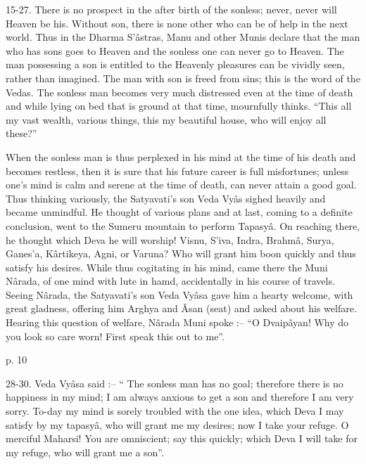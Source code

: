  

15-27. There is no prospect in the after birth of the sonless; never, never will Heaven be his. Without son, there is none other who can be of help in the next world. Thus in the Dharma S’âstras, Manu and other Munis declare that the man who has sons goes to Heaven and the sonless one can never go to Heaven. The man possessing a son is entitled to the Heavenly pleasures can be vividly seen, rather than imagined. The man with son is freed from sins; this is the word of the Vedas. The sonless man becomes very much distressed even at the time of death and while lying on bed that is ground at that time, mournfully thinks. “This all my vast wealth, various things, this my beautiful house, who will enjoy all these?”

 

When the sonless man is thus perplexed in his mind at the time of his death and becomes restless, then it is sure that his future career is full misfortunes; unless one’s mind is calm and serene at the time of death, can never attain a good goal. Thus thinking variously, the Satyavati's son Veda Vyâs sighed heavily and became unmindful. He thought of various plans and at last, coming to a definite conclusion, went to the Sumeru mountain to perform Tapasyâ. On reaching there, he thought which Deva he will worship! Visnu, S’iva, Indra, Brahmâ, Surya, Ganes’a, Kârtikeya, Agni, or Varuna? Who will grant him boon quickly and thus satisfy his desires. While thus cogitating in his mind, came there the Muni Nârada, of one mind with lute in hamd, accidentally in his course of travels. Seeing Nârada, the Satyavati’s son Veda Vyâsa gave him a hearty welcome, with great gladness, offering him Arghya and Âsan (seat) and asked about his welfare. Hearing this question of welfare, Nârada Muni spoke :-- “O Dvaipâyan! Why do you look so care worn! First speak this out to me”.

 

p. 10

 

28-30. Veda Vyâsa said :-- “ The sonless man has no goal; therefore there is no happiness in my mind; I am always anxious to get a son and therefore I am very sorry. To-day my mind is sorely troubled with the one idea, which Deva I may satisfy by my tapasyâ, who will grant me my desires; now I take your refuge. O merciful Maharsi! You are omniscient; say this quickly; which Deva I will take for my refuge, who will grant me a son”.

 

